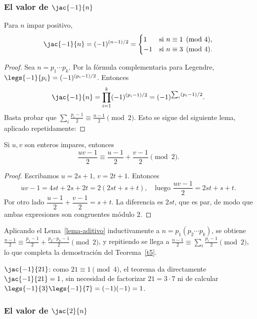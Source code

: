 \subsubsection{El valor de $\jac{-1}{n}$}

\begin{teorema}\label{t5}
Para $n$ impar positivo,
\[
\jac{-1}{n}=(-1)^{(n-1)/2}=
\begin{cases}
1 & \text{si } n\equiv1\pmod4,\\
-1 & \text{si } n\equiv3\pmod4.
\end{cases}
\]
\end{teorema}
\begin{proof}
Sea $n=p_1\cdots p_k$. Por la fórmula complementaria para Legendre, $\legs{-1}{p_i}=(-1)^{(p_i-1)/2}$. Entonces
\[
\jac{-1}{n}=\prod_{i=1}^k(-1)^{(p_i-1)/2}=(-1)^{\sum_i (p_i-1)/2}.
\]
Basta probar que $\sum_i\frac{p_i-1}{2}\equiv\frac{n-1}{2}\pmod 2$. Esto se sigue del siguiente lema, aplicado repetidamente:
\end{proof}

\begin{lema}\label{lema-aditivo}
Si $u,v$ son enteros impares, entonces
\[
\frac{uv-1}{2}\equiv\frac{u-1}{2}+\frac{v-1}{2}\pmod 2.
\]
\end{lema}
\begin{proof}
Escribamos $u=2s+1$, $v=2t+1$. Entonces
\[
uv-1=4st+2s+2t=2(2st+s+t),\quad\text{luego } \frac{uv-1}{2}=2st+s+t.
\]
Por otro lado $\dfrac{u-1}{2}+\dfrac{v-1}{2}=s+t$. La diferencia es $2st$, que es par, de modo que ambas expresiones son congruentes módulo $2$.
\end{proof}

Aplicando el Lema~\ref{lema-aditivo} inductivamente a $n=p_1(p_2\cdots p_k)$, se obtiene $\frac{n-1}{2}\equiv\frac{p_1-1}{2}+\frac{p_2\cdots p_k-1}{2}\pmod2$, y repitiendo se llega a $\frac{n-1}{2}\equiv\sum_i\frac{p_i-1}{2}\pmod2$, lo que completa la demostración del Teorema~\ref{t5}.

\begin{ejemplo}
$\jac{-1}{21}$: como $21\equiv1\pmod4$, el teorema da directamente $\jac{-1}{21}=1$, sin necesidad de factorizar $21=3\cdot7$ ni de calcular $\legs{-1}{3}\legs{-1}{7}=(-1)(-1)=1$.
\end{ejemplo}

\subsubsection{El valor de $\jac{2}{n}$}

